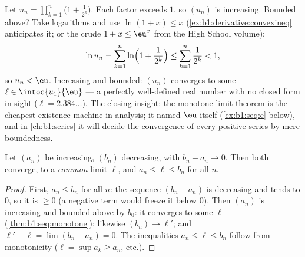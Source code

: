 \begin{example}\label{ex:b1:seq:existencemachine}
Let $u_n = \prod_{k=1}^{n} \bigl(1 + \frac{1}{2^k}\bigr)$. Each
factor exceeds $1$, so $(u_n)$ is increasing. Bounded above? Take
logarithms and use $\ln(1 + x) \leq x$
(\cref{ex:b1:derivative:convexineq} anticipates it; or the
crude $1 + x \leq \eu^x$ from the High School volume):
\[
\ln u_n = \sum_{k=1}^{n} \ln\Bigl(1 + \frac{1}{2^k}\Bigr)
\leq \sum_{k=1}^{n} \frac{1}{2^k} < 1 ,
\]
so $u_n < \eu$. Increasing and bounded: $(u_n)$ converges to some
$\ell \in \intoc{u_1}{\eu}$ --- a perfectly well-defined real
number with no closed form in sight ($\ell = 2.384\dots$). The
closing insight: the monotone limit theorem is the cheapest
existence machine in analysis; it named $\eu$ itself
(\cref{ex:b1:seq:e} below), and in \cref{ch:b1:series} it will
decide the convergence of every positive series by mere
boundedness.
\end{example}

\begin{theorem}\label{thm:b1:seq:adjacent}
Let $(a_n)$ be increasing, $(b_n)$ decreasing, with $b_n - a_n \to
0$. Then both converge, to a \emph{common} limit $\ell$, and $a_n
\leq \ell \leq b_n$ for all $n$.
\end{theorem}

\begin{proof}
First, $a_n \leq b_n$ for all $n$: the sequence $(b_n - a_n)$ is
decreasing and tends to $0$, so it is $\geq 0$ (a negative term would
freeze it below $0$). Then $(a_n)$ is increasing and bounded above by
$b_0$: it converges to some $\ell$ (\cref{thm:b1:seq:monotone});
likewise $(b_n) \to \ell'$; and $\ell' - \ell = \lim (b_n - a_n) =
0$. The inequalities $a_n \leq \ell \leq b_n$ follow from
monotonicity ($\ell = \sup a_k \geq a_n$, etc.).
\end{proof}


